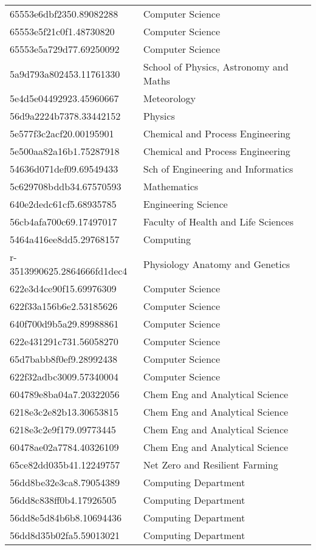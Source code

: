 \begin{tabular}{ll}
65553e6dbf2350.89082288 & Computer Science \\
65553e5f21c0f1.48730820 & Computer Science \\
65553e5a729d77.69250092 & Computer Science \\
5a9d793a802453.11761330 & School of Physics, Astronomy and Maths \\
5e4d5e04492923.45960667 & Meteorology \\
56d9a2224b7378.33442152 & Physics \\
5e577f3c2acf20.00195901 & Chemical and Process Engineering \\
5e500aa82a16b1.75287918 & Chemical and Process Engineering \\
54636d071def09.69549433 & Sch of Engineering and Informatics \\
5c629708bddb34.67570593 & Mathematics \\
640e2dedc61cf5.68935785 & Engineering Science \\
56cb4afa700c69.17497017 & Faculty of Health and Life Sciences \\
5464a416ee8dd5.29768157 & Computing \\
r-3513990625.2864666fd1dec4 & Physiology Anatomy and Genetics \\
622e3d4ce90f15.69976309 & Computer Science \\
622f33a156b6e2.53185626 & Computer Science \\
640f700d9b5a29.89988861 & Computer Science \\
622e431291c731.56058270 & Computer Science \\
65d7babb8f0ef9.28992438 & Computer Science \\
622f32adbc3009.57340004 & Computer Science \\
604789e8ba04a7.20322056 & Chem Eng and Analytical Science \\
6218e3c2e82b13.30653815 & Chem Eng and Analytical Science \\
6218e3c2e9f179.09773445 & Chem Eng and Analytical Science \\
60478ae02a7784.40326109 & Chem Eng and Analytical Science \\
65ce82dd035b41.12249757 & Net Zero and Resilient Farming \\
56dd8be32e3ca8.79054389 & Computing Department \\
56dd8c838ff0b4.17926505 & Computing Department \\
56dd8e5d84b6b8.10694436 & Computing Department \\
56dd8d35b02fa5.59013021 & Computing Department \\

\end{tabular}
